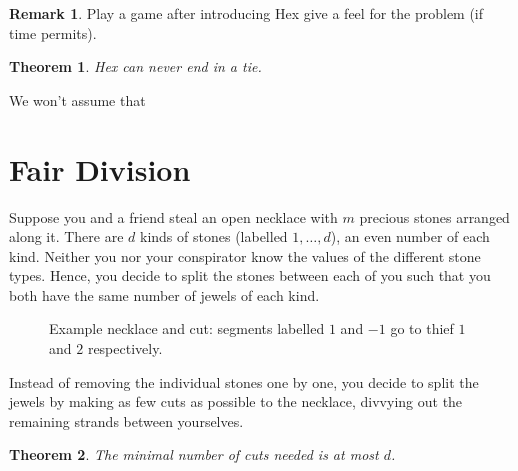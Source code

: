 \documentclass[12pt]{amsart}
\newtheorem{thm}{Theorem}[section]
\theoremstyle{definition}
\newtheorem*{rem}{Remark}
\begin{document}
    \begin{rem}
        Play a game after introducing Hex give a feel for the problem (if time permits). 
    \end{rem}

    \begin{thm}
        Hex can never end in a tie.
    \end{thm}

    We won't assume that



    \newpage

    \section{Fair Division}

    Suppose you and a friend steal an open necklace with $m$ precious stones arranged along it. There are $d$ kinds of stones (labelled $1,\ldots,d$), an even number of each kind. Neither you nor your conspirator know the values of the different stone types. Hence, you decide to split the stones between each of you such that you both have the same number of jewels of each kind. 
    
    \begin{figure}[h]
        \begin{tikzpicture}
            
        \end{tikzpicture}
        \caption{Example necklace and cut: segments labelled $1$ and $-1$ go to thief $1$ and $2$ respectively.}
    \end{figure}

    Instead of removing the individual stones one by one, you decide to split the jewels by making as few cuts as possible to the necklace, divvying out the remaining strands between yourselves. 

    \begin{thm}
        The minimal number of cuts needed is at most $d$.
    \end{thm}
\end{document}
